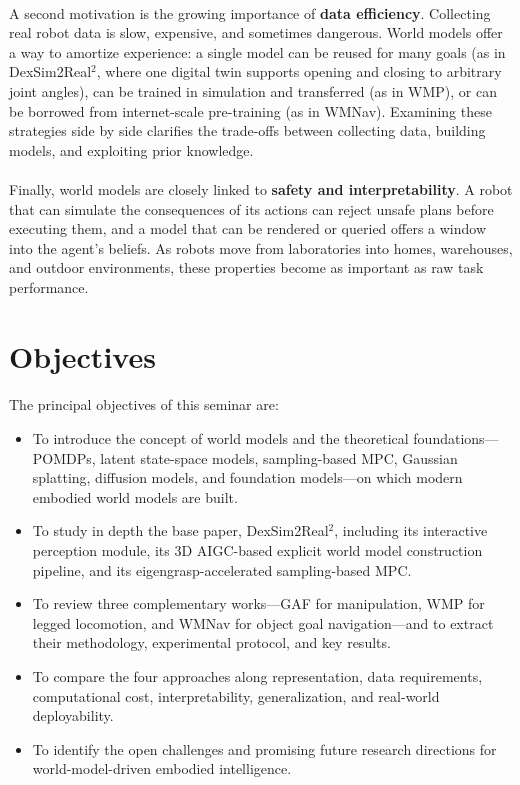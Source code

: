 \documentclass[12pt,a4paper,final]{extreport}
\begin{document}
\paragraph{} A second motivation is the growing importance of \textbf{data efficiency}. Collecting real robot data is slow, expensive, and sometimes dangerous. World models offer a way to amortize experience: a single model can be reused for many goals (as in DexSim2Real$^2$, where one digital twin supports opening and closing to arbitrary joint angles), can be trained in simulation and transferred (as in WMP), or can be borrowed from internet-scale pre-training (as in WMNav). Examining these strategies side by side clarifies the trade-offs between collecting data, building models, and exploiting prior knowledge.

\paragraph{} Finally, world models are closely linked to \textbf{safety and interpretability}. A robot that can simulate the consequences of its actions can reject unsafe plans before executing them, and a model that can be rendered or queried offers a window into the agent's beliefs. As robots move from laboratories into homes, warehouses, and outdoor environments, these properties become as important as raw task performance.

\section{Objectives}

\paragraph{} The principal objectives of this seminar are:
\begin{itemize}
  \item To introduce the concept of world models and the theoretical foundations---POMDPs, latent state-space models, sampling-based MPC, Gaussian splatting, diffusion models, and foundation models---on which modern embodied world models are built.
  \item To study in depth the base paper, DexSim2Real$^2$, including its interactive perception module, its 3D AIGC-based explicit world model construction pipeline, and its eigengrasp-accelerated sampling-based MPC.
  \item To review three complementary works---GAF for manipulation, WMP for legged locomotion, and WMNav for object goal navigation---and to extract their methodology, experimental protocol, and key results.
  \item To compare the four approaches along representation, data requirements, computational cost, interpretability, generalization, and real-world deployability.
  \item To identify the open challenges and promising future research directions for world-model-driven embodied intelligence.
\end{itemize}
\end{document}
